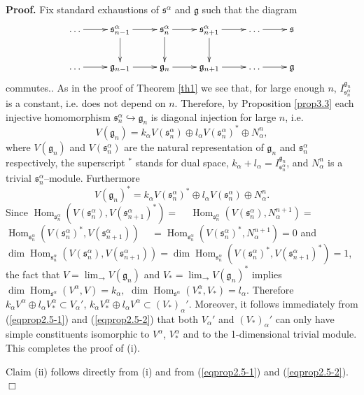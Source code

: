 \documentclass[oneside,leqno,12pt]{article}
\newenvironment{proof}{ \noindent \textbf{Proof.}}{\hfill $\Box$}
\def\gg{\mathfrak{g}}
\DeclareMathOperator{\Hom}{Hom}
\renewcommand{\ss}{\mathfrak{s}}
\renewcommand{\gg}{\mathfrak{g}}
\newcommand{\refth}[1]{Theorem \ref{#1}}
\newcommand{\refprop}[1]{Proposition \ref{#1}}
\newcommand{\refeq}[1]{(\ref{#1})}
\newcommand{\inj}{\displaystyle \lim_\to}
\begin{document}
\begin{proof}
Fix standard exhaustions of $\ss^\alpha$ and $\gg$ such that the diagram  
\begin{equation*}
\xymatrix{
\dots\ar[r]&\ss_{n-1}^\alpha \ar[d]\ar[r]&\ss_n^\alpha \ar[d]\ar[r]&\ss_{n+1}^\alpha \ar[d]\ar[r]&\dots\ar[r]&\ss\\
\dots\ar[r]&\gg_{n-1}\ar[r]&\gg_n\ar[r]&\gg_{n+1}\ar[r]&\dots\ar[r]&\gg\\
}
\end{equation*}
commutes.. As in the proof of \refth{th1} we see that, for large enough $n$, $I_{\ss_n^\alpha}^{\gg_n} $ is a constant, i.e. does not depend on $n$. Therefore, by \refprop{prop3.3} each injective homomorphism $\ss_n^\alpha\hookrightarrow\gg_n$ is diagonal injection for large $n$, i.e.  
\begin{equation}\label{eqprop2.5-1}
V(\gg_n)=k_\alpha V(\ss_n^\alpha)\oplus l_\alpha V(\ss_n^\alpha)^*\oplus N_\alpha^n,
\end{equation}
where $V(\gg_n)$ and $V(\ss_n^\alpha)$ are the natural representation of $\gg_n$ and $\ss_n^\alpha$ respectively, the superscript $^*$ stands for dual space, $k_\alpha+l_\alpha=I_{\ss_n^\alpha}^{\gg_n}$, and $N_\alpha^n$ is a trivial $\ss_n^\alpha$--module. Furthermore
\begin{equation}\label{eqprop2.5-2}
V(\gg_n)^*=k_\alpha V(\ss_n^\alpha)^*\oplus l_\alpha V(\ss_n^\alpha)\oplus N_\alpha^n.
\end{equation}
Since $\Hom_{\ss_n^\alpha}(V(\ss_n^\alpha), V(\ss_{n+1}^\alpha)^*)=$ ~
$\Hom_{\ss_n^\alpha}(V(\ss_n^\alpha),N_\alpha^{n+1} )=$  ~
$\Hom_{\ss_n^\alpha}(V(\ss_n^\alpha)^*, V(\ss_{n+1}^\alpha))$ ~
$=\Hom_{\ss_n^\alpha}(V(\ss_n^\alpha)^*,N_\alpha^{n+1} )=0$ and $\dim \Hom_{\ss_n^\alpha}(V(\ss_n^\alpha), V(\ss_{n+1}^\alpha))=\dim\Hom_{\ss_n^\alpha}(V(\ss_n^\alpha)^*, V(\ss_{n+1}^\alpha)^*)=1 $, the fact that $V = \inj V(\gg_n)$ and $V_* = \inj V(\gg_n)^*$ implies $\dim \Hom_{\ss^\alpha}(V^\alpha, V)=k_\alpha,$ $\dim \Hom_{\ss^\alpha}(V_*^\alpha, V_*)=l_\alpha$. Therefore $k_\alpha V^\alpha\oplus l_\alpha V_*^\alpha\subset V_\alpha'$, $k_\alpha V^\alpha_*\oplus l_\alpha V^\alpha\subset (V_*)_\alpha'$. Moreover, it follows immediately from \refeq{eqprop2.5-1} and \refeq{eqprop2.5-2} that both $V_\alpha'$ and $(V_*)_\alpha'$ can only have simple constituents isomorphic to $V^\alpha$, $V^\alpha_*$ and to the 1-dimensional trivial module. This completes the proof of (i). 

Claim (ii) follows directly from (i) and from \refeq{eqprop2.5-1} and \refeq{eqprop2.5-2}.
\end{proof}
\end{document}
